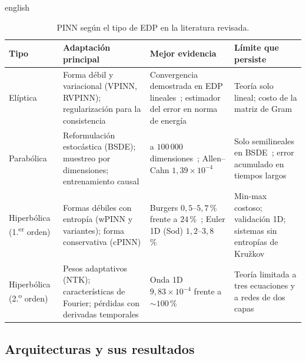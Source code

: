 \documentclass[../0000.tex]{subfiles}
\begin{document}
\begin{hyphenrules}{english}
\begin{table}[htbp]
\centering\small
\caption{PINN según el tipo de EDP en la literatura revisada.}
\label{tab:ea-tipos}
\begin{tabularx}{\textwidth}{@{}l >{\raggedright\arraybackslash}X >{\raggedright\arraybackslash}X >{\raggedright\arraybackslash}X@{}}
\toprule
Tipo & Adaptación principal & Mejor evidencia & Límite que persiste \\
\midrule
Elíptica & Forma débil y variacional (VPINN, RVPINN); regularización para la consistencia & Convergencia demostrada en EDP lineales~\cite{shin2020convergence,doumeche2025convergence}; estimador del error en norma de energía~\cite{rojas2024robust} & Teoría solo lineal; costo de la matriz de Gram~\cite{rojas2024robust} \\
Parabólica & Reformulación estocástica (BSDE); muestreo por dimensiones; entrenamiento causal & 100 a $100\,000$ dimensiones~\cite{han2018solving,hu2024tackling}; Allen--Cahn $1{,}39\times10^{-4}$~\cite{wang2024causality} & Solo semilineales en BSDE~\cite{han2018solving}; error acumulado en tiempos largos~\cite{wang2024causality} \\
Hiperbólica (1.\textsuperscript{er} orden) & Formas débiles con entropía (wPINN y variantes); forma conservativa (cPINN) & Burgers $0{,}5$--$5{,}7$\,\% frente a $24$\,\%~\cite{deryck2024wpinn}; Euler 1D (Sod) $1{,}2$--$3{,}8$\,\%~\cite{chaumet2024improving} & Min-max costoso; validación 1D; sistemas sin entropías de Kružkov~\cite{deryck2024wpinn,chaumet2024improving} \\
Hiperbólica (2.\textsuperscript{o} orden) & Pesos adaptativos (NTK); características de Fourier; pérdidas con derivadas temporales & Onda 1D $9{,}83\times10^{-4}$ frente a ${\sim}100$\,\%~\cite{wang2021eigenvector} & Teoría limitada a tres ecuaciones y a redes de dos capas~\cite{qian2023} \\
\bottomrule
\end{tabularx}
\end{table}

\subsection{Arquitecturas y sus resultados}
\label{subsec:ea-arq}


\end{hyphenrules}
\end{document}
